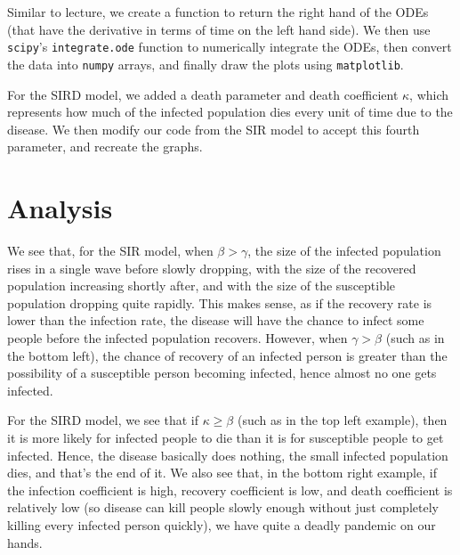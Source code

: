 \documentclass[12pt]{article}
\newcommand{\code}[1]{\colorbox{backcolour}{\texttt{#1}}}
\begin{document}
Similar to lecture, we create a function to return the right hand of the ODEs (that have the derivative in terms of time on the left hand side). We then use \code{scipy}'s \code{integrate.ode} function to numerically integrate the ODEs, then convert the data into \code{numpy} arrays, and finally draw the plots using \code{matplotlib}. 

For the SIRD model, we added a death parameter and death coefficient \(\kappa\), which represents how much of the infected population dies every unit of time due to the disease. We then modify our code from the SIR model to accept this fourth parameter, and recreate the graphs.

\section*{Analysis}

We see that, for the SIR model, when \(\beta > \gamma\), the size of the infected population rises in a single wave before slowly dropping, with the size of the recovered population increasing shortly after, and with the size of the susceptible population dropping quite rapidly. This makes sense, as if the recovery rate is lower than the infection rate, the disease will have the chance to infect some people before the infected population recovers. However, when \(\gamma > \beta\) (such as in the bottom left), the chance of recovery of an infected person is greater than the possibility of a susceptible person becoming infected, hence almost no one gets infected. 

\medspace

For the SIRD model, we see that if $\kappa \geq \beta$ (such as in the top left example), then it is more likely for infected people to die than it is for susceptible people to get infected. Hence, the disease basically does nothing, the small infected population dies, and that's the end of it. We also see that, in the bottom right example, if the infection coefficient is high, recovery coefficient is low, and death coefficient is relatively low (so disease can kill people slowly enough without just completely killing every infected person quickly), we have quite a deadly pandemic on our hands.
\end{document}
